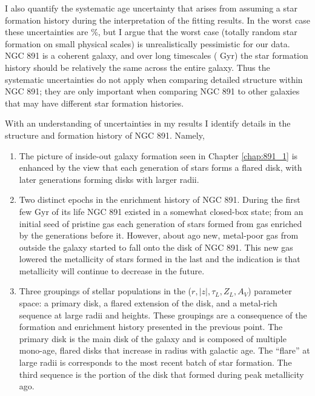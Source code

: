 I also quantify the systematic age uncertainty that arises from
assuming a star formation history during the interpretation of the
fitting results. In the worst case these uncertainties are \%,
but I argue that the worst case (totally random star formation on
small physical scales) is unrealistically pessimistic for our
data. NGC 891 is a coherent galaxy, and over long timescales (
Gyr) the star formation history should be relatively the same across
the entire galaxy. Thus the systematic uncertainties do not apply when
comparing detailed structure within NGC 891; they are only important
when comparing NGC 891 to other galaxies that may have different star
formation histories.

With an understanding of uncertainties in my results I identify
details in the structure and formation history of NGC 891. Namely,
\begin{enumerate}

\item The picture of inside-out galaxy formation seen in Chapter
  \ref{chap:891_1} is enhanced by the view that each generation of
  stars forms a flared disk, with later generations forming disks with
  larger radii.

\item Two distinct epochs in the enrichment history of NGC 891. During
  the first few Gyr of its life NGC 891 existed in a somewhat
  closed-box state; from an initial seed of pristine gas each
  generation of stars formed from gas enriched by the generations
  before it. However, about  ago new, metal-poor gas
  from outside the galaxy started to fall onto the disk of NGC
  891. This new gas lowered the metallicity of stars formed in the last
   and the indication is that metallicity will continue
  to decrease in the future.

\item Three groupings of stellar populations in the
  ($r,|z|,\tau_L,Z_L,A_V$) parameter space: a primary disk, a flared
  extension of the disk, and a metal-rich sequence at large radii and
  heights. These groupings are a consequence of the formation and
  enrichment history presented in the previous point. The primary disk
  is the main disk of the galaxy and is composed of multiple mono-age,
  flared disks that increase in radius with galactic age. The
  ``flare'' at large radii is corresponds to the most recent batch of
  star formation. The third sequence is the portion of the disk that
  formed during peak metallicity  ago.

\end{enumerate}

